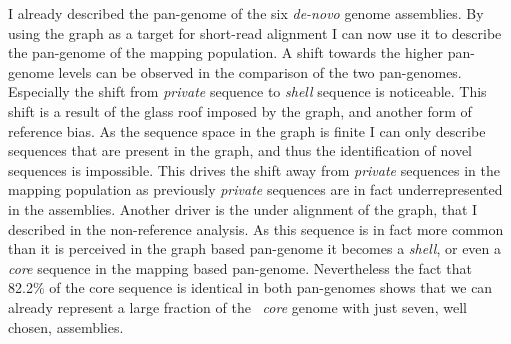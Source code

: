 I already described the pan-genome of the six \textit{de-novo} genome assemblies. By using the graph as a target for short-read alignment I can now use it to describe the pan-genome of the mapping population. A shift towards the higher pan-genome levels can be observed in the comparison of the two pan-genomes. Especially the shift from \textit{private} sequence to \textit{shell} sequence is noticeable. This shift is a result of the glass roof imposed by the graph, and another form of reference bias. As the sequence space in the graph is finite I can only describe sequences that are present in the graph, and thus the identification of novel sequences is impossible. This drives the shift away from \textit{private} sequences in the mapping population as previously \textit{private} sequences are in fact underrepresented in the assemblies. Another driver is the under alignment of the graph, that I described in the non-reference analysis. As this sequence is in fact more common than it is perceived in the graph based pan-genome it becomes a \textit{shell}, or even a \textit{core} sequence in the mapping based pan-genome. Nevertheless the fact that 82.2\% of the core sequence is identical in both pan-genomes shows that we can already represent a large fraction of the \ath\ \textit{core} genome with just seven, well chosen, assemblies. \newline
